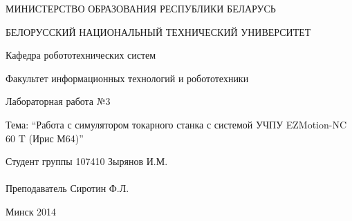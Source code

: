 \begin{titlepage} %

\thispagestyle{empty} %

\begin{center}
МИНИСТЕРСТВО ОБРАЗОВАНИЯ РЕСПУБЛИКИ БЕЛАРУСЬ

БЕЛОРУССКИЙ НАЦИОНАЛЬНЫЙ ТЕХНИЧЕСКИЙ УНИВЕРСИТЕТ

Кафедра робототехнических систем

Факультет информационных технологий и робототехники
\end{center}

\vfill

\begin{center}
Лабораторная работа №3

Тема: ``Работа с симулятором токарного станка с системой УЧПУ EZMotion-NC 60 T (Ирис М64)''
\end{center}

\vfill

\noindent
Студент группы 107410 \hfill Зырянов И.М.
\\
\\
\noindent
Преподаватель \hfill Сиротин Ф.Л.

\vfill

\centerline{Минск 2014}

\clearpage %

\end{titlepage}

\setcounter{page}{2}

